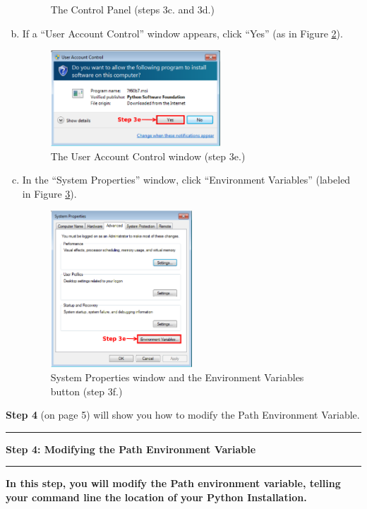 \documentclass[11pt,english]{article}
\newcommand{\myhrule}{\vspace{0.3cm}\hrule\vspace{0.3cm}}
\begin{document}
\begin{enumerate}[a.]
\begin{figure}[h]
\vspace{-0.5cm}
\caption{The Control Panel (steps 3c. and 3d.)}
\label{fig:dia5}
\end{figure}
\item If a ``User Account Control'' window appears, click ``Yes'' (as in Figure
\ref{fig:dia11}).
\begin{figure}[h]
\begin{center}
\includegraphics[width=0.6\textwidth]{dia11}
\end{center}
\caption{The User Account Control window (step 3e.)}
\label{fig:dia11}
\end{figure}
\item In the ``System Properties'' window, click ``Environment
Variables'' (labeled in Figure \ref{fig:dia6}).
\begin{figure}[h]
\begin{center}
\includegraphics[width=0.5\textwidth]{dia6}
\end{center}
\vspace{-0.5cm}
\caption{System Properties window and the Environment Variables button (step
3f.)}
\label{fig:dia6}
\end{figure}
\end{enumerate}
\vfill
{\bf Step 4} (on page 5) will show you how to modify the Path Environment
Variable.
\myhrule

\newpage
{\Large {\bf Step 4: Modifying the Path Environment Variable}}
\myhrule
{\bf In this step, you will modify the Path environment variable, telling your
command line the location of your Python Installation.}\\
\end{document}

